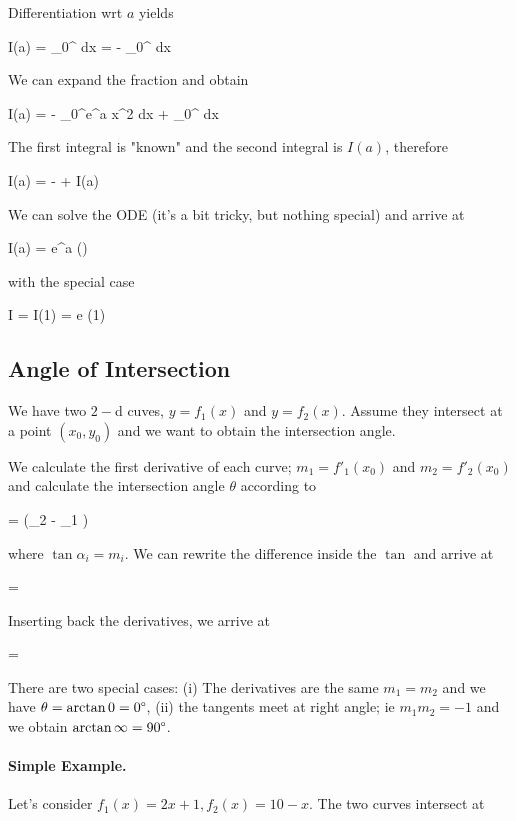 Differentiation wrt $a$ yields

\bee
{} I(a) = \int_0^\infty {}  dx = - \int_0^\infty {} dx
\eee

We can expand the fraction and obtain

\bee
{} I(a) = - \int_0^\infty e^{a x^2} dx + \int_0^\infty {} dx
\eee

The first integral is "known" and the second integral is $I(a)$, therefore

\bee
{} I(a) = -   + I(a)
\eee

We can solve the ODE (it's a bit tricky, but nothing special) and arrive at

\bee
I(a) =  e^a \erfc()
\eee

with the special case

\bee
I = I(1) =  e \erfc(1)
\eee


\subsection{Angle of Intersection}

We have two $2-$d cuves, $y = f_1(x)$ and $y = f_2(x)$. Assume they intersect at a point $(x_0, y_0)$ and we want to obtain the intersection angle.

We calculate the first derivative of each curve; $m_1 = f'_1(x_0)$ and $m_2 =f'_2(x_0)$ and calculate the intersection angle $\theta$ according to

\bee
\tan \theta = \tan (\alpha_2 - \alpha_1 )
\eee

where $\tan \alpha_i = m_i$. We can rewrite the difference inside the $\tan$ and arrive at

\bee
\tan \theta = 
\eee

Inserting back the derivatives, we arrive at

\bee
\theta = \arctan {}
\eee

There are two special cases: (i) The derivatives are the same $m_1 = m_2$ and we have $\theta = \arctan 0 = 0 \degree$, (ii) the tangents meet at right angle; ie $m_1 m_2 = -1$ and we obtain $\arctan \infty = 90 \degree$.

\paragraph{Simple Example.} Let's consider $f_1(x) = 2x+1, f_2(x) = 10-x$. The two curves intersect at

